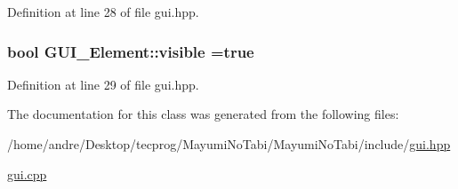 Definition at line 28 of file gui.\-hpp.

\hypertarget{class_g_u_i___element_a7bfaeacd165d24cfcaccb158665a1e2f}{
\subsubsection[{visible}]{\setlength{\rightskip}{0pt plus 5cm}bool G\-U\-I\-\_\-\-Element\-::visible =true\hspace{0.3cm}{\ttfamily [protected]}}}\label{class_g_u_i___element_a7bfaeacd165d24cfcaccb158665a1e2f}


Definition at line 29 of file gui.\-hpp.



The documentation for this class was generated from the following files\-:\begin{DoxyCompactItemize}
\item 
/home/andre/\-Desktop/tecprog/\-Mayumi\-No\-Tabi/\-Mayumi\-No\-Tabi/include/\hyperlink{gui_8hpp}{gui.\-hpp}\item 
\hyperlink{gui_8cpp}{gui.\-cpp}\end{DoxyCompactItemize}
